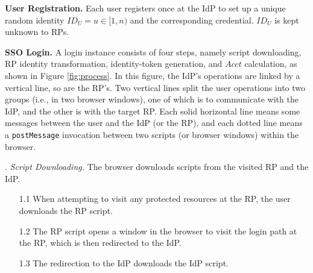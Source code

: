 \noindent\textbf{User Registration.}
Each user registers once at the IdP to set up a unique random identity $ID_U = u \in [1, n)$ and the corresponding credential. $ID_U$ is kept unknown to RPs.


\vspace{1mm}
\noindent\textbf{SSO Login.} A login instance %
consists of four steps, namely script downloading, RP identity transformation,
identity-token generation, and $Acct$ calculation, as shown in Figure \ref{fig:process}.
In this figure,
    the IdP's operations are linked by a vertical line,
        so are the RP's.
Two vertical lines split the user operations into two groups (i.e., in two browser windows),
    one of which is to communicate with the IdP,
                 and the other is with the target RP.
Each solid horizontal line means some messages between the user and the IdP (or the RP),
            and each dotted line means a \verb+postMessage+ invocation between two scripts (or browser windows) within the browser.


\vspace{1mm}
. {\em Script Downloading.}
The browser downloads scripts from the visited RP and the IdP.
\vspace{-\topsep}
\begin{itemize}
\setlength{\topsep}{0pt}
\setlength{\partopsep}{0pt}
\setlength{\itemsep}{0pt}
\setlength{\parsep}{0pt}
\setlength{\parskip}{0pt}
\item[1.1]
When attempting to visit any protected resources at the RP,
    the user downloads the RP script.
\item[1.2]
The RP script opens a window in the browser to visit the login path at the RP, which is then redirected to the IdP.
\item[1.3]
The redirection to the IdP downloads the IdP script.
\end{itemize}



